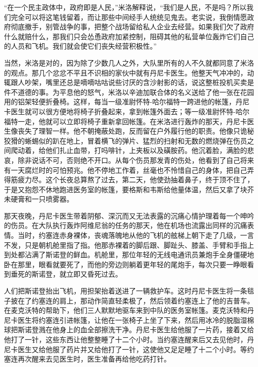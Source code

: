     “在一个民主政体中，政府即是人民，”米洛解释说，“我们是人民，不是吗？所以我们完全可以将这笔钱留着，而让那些中间经手人统统见鬼去。老实说，我倒情愿政府彻底撤手，别管战争的事，把整个战场留给私人企业去经营。如果我们欠了政府什么就赔什么，那我们只会怂恿政府加紧控制，阻碍其他的私营单位轰炸它们自己的人员和飞机。我们就会使它们丧失经营积极性。”
 


    当然，米洛是对的，因为除了少数几人之外，大队里所有的人不久就都同意了米洛的观点。那几个忿忿不平且不识相的家伙中就有丹尼卡医生。他整天气冲冲的，动辄跟人吵架，嘴里还总是嘀嘀咕咕说些讨厌的含沙射影的话，说这整桩投机买卖是件不道德的事。为平息他的怒气，米洛以辛迪加联合体的名义送给了他一张在花园用的铝架轻便折叠椅。这样，每当一级准尉怀特-哈尔福特一跨进他的帐篷，丹尼卡医生就可以很方便地将椅子折叠起来，拿到帐篷外面去；等一级准尉怀特-哈尔福特一走，他就可以立即将椅子重新拿回帐篷。在米洛进行轰炸的那天，丹尼卡医生像丧失了理智一样。他不朝掩蔽处跑，反而留在户外履行他的职责。他像只诡秘狡猾的蜥蜴似的趴在地上，冒着横飞的弹片、猛烈的扫射和无数的燃烧弹在伤员之间爬动着，给他们扎止血带，打吗啡针，上夹板以及磺胺药。他沉着脸，满脸的悲哀，除非说话不可，否则绝不开口。从每个伤员那发青的伤处，他看到了自己将来有一天腐烂时的可怕预兆。他不停地工作着，丝毫也不怜惜自己的身体，把自己弄得筋疲力尽。这个长夜总算熬了过去，第二天，他使劲抽着鼻子，终于顶不住了，于是又抱怨不休地跑进医务室的帐篷，要格斯和韦斯给他量体温，然后又拿了块芥未硬膏和一只喷雾器。

    那天夜晚，丹尼卡医生带着阴郁、深沉而又无法表露的沉痛心情护理着每一个呻吟的伤员。在大队执行轰炸阿维尼翁的任务的那天，他在机场也流露出同样的沉痛表情。当时，约塞连赤身裸体，丧魂落魄地从他的飞机的舷梯上朝下走了几级，一言不发，只是朝机舱里指了指。他那赤裸着的脚后跟、脚趾头、膝盖、手臂和手指上到处都沾满了斯诺登的鲜血。机舱里，那位年轻的无线电通讯员兼炮手全身僵硬地卧在那里，眼看就要死了，而他的旁边则躺着更年轻的尾炮手，每次只要一睁眼看到垂死的斯诺登，就立即又昏死过去。

    人们把斯诺登抬出飞机，用担架抬着送进了一辆救护车。这时丹尼卡医生将一条毯子披在了约塞连的肩上，那动作简直轻柔极了，然后领着约塞连上了他的吉普车。在麦克沃特的帮助下，他们三人默默地驱车来到中队的医务室帐篷。麦克沃特和丹尼卡医生将约塞连引进帐篷，让他在一张椅子上坐了下来，然后用冰冷的脱脂湿棉球把斯诺登溅在他身上的血全部擦洗干净。丹尼卡医生给他服了一片药，接着又给他打了一针，这些东西让他整整睡了十二个小时。当约塞连醒来后又去见他时，丹尼卡医生又给他服了药片并又给他打了一针，这使他又足足睡了十二个小时。等约塞连再次醒来去见医生时，医生准备再给他吃药打针。

